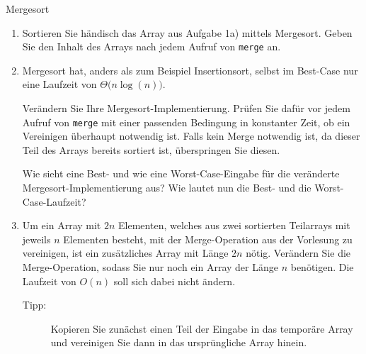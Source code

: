 \documentclass[11pt,a4paper]{article}
\begin{document}
\begin{aufgabe}{2}{Mergesort}
    \begin{enumerate}
        \item Sortieren Sie händisch das Array aus Aufgabe 1a) mittels Mergesort.
        Geben Sie den Inhalt des Arrays nach jedem Aufruf von \texttt{merge} an.
        \item Mergesort hat, anders als zum Beispiel Insertionsort, selbst im Best-Case nur eine Laufzeit von $\Theta\big(n \log(n)\big)$.

        Verändern Sie Ihre Mergesort-Implementierung.
        Prüfen Sie dafür vor jedem Aufruf von \texttt{merge} mit einer passenden Bedingung in konstanter Zeit, ob ein Vereinigen überhaupt notwendig ist.
        Falls kein Merge notwendig ist, da dieser Teil des Arrays bereits sortiert ist, überspringen Sie diesen.

        Wie sieht eine Best- und wie eine Worst-Case-Eingabe für die veränderte Mergesort-Implementierung aus?
        Wie lautet nun die Best- und die Worst-Case-Laufzeit?
        \item \hard Um ein Array mit $2n$ Elementen, welches aus zwei sortierten Teilarrays mit jeweils $n$ Elementen besteht, mit der Merge-Operation aus der Vorlesung zu vereinigen, ist ein zusätzliches Array mit Länge $2n$ nötig.
        Verändern Sie die Merge-Operation, sodass Sie nur noch ein Array der Länge $n$ benötigen. Die Laufzeit von $O(n)$ soll sich dabei nicht ändern.
        \begin{description}
            \item[Tipp:] Kopieren Sie zunächst einen Teil der Eingabe in das temporäre Array und vereinigen Sie dann in das ursprüngliche Array hinein.
        \end{description}
    \end{enumerate}
    
\end{aufgabe}
\end{document}
